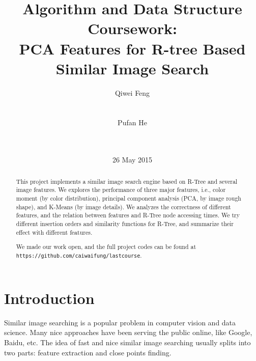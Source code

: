 \documentclass{acm_proc_article-sp}
\begin{document}
\title{Algorithm and Data Structure Coursework: \\PCA Features for
R-tree Based Similar Image Search}
\subtitle{}
%
%
\author{\alignauthor
Qiwei Feng\\
       \\
       \\
\alignauthor
Pufan He\\
       \\
       \\
}
\date{26 May 2015}

\maketitle
\begin{abstract}
This project implements a similar image search engine based on R-Tree and
several image features. We explores the performance of three major features,
i.e., color moment (by color distribution), principal component analysis (PCA,
by image rough shape), and K-Means (by image details). We analyzes the
correctness of different features, and the relation between features and R-Tree
node accessing times. We try different insertion orders and similarity
functions for R-Tree, and summarize their effect with different features.

We made our work open, and the full project codes can be found at \texttt{https://github.com/caiwaifung/lastcourse}.
\end{abstract}


\section{Introduction}
Similar image searching is a popular problem in computer vision and data
science. Many nice approaches have been serving the public online, like Google,
Baidu, etc. The idea of fast and nice similar image searching usually splits
into two parts: feature extraction and close points finding.
\end{document}
